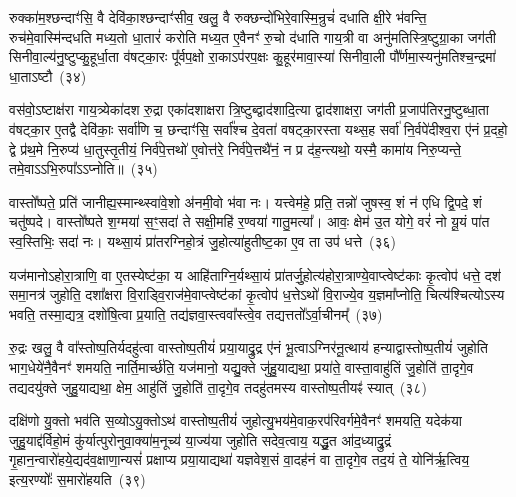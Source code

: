 रुक्का॑म॒श्छन्दाꣳ॑सि॒ वै देवि॑का॒श्छन्दाꣳ॑सीव॒ खलु॒ वै रुक्छन्दो॑भिरे॒वास्मि॒न्रुचं॑ दधाति क्षी॒रे भ॑वन्ति॒ रुच॑मे॒वास्मि॑न्दधति मध्य॒तो धा॒तारं॑ करोति मध्य॒त ए॒वैनꣳ॑ रु॒चो द॑धाति गाय॒त्री वा अनु॑मतिस्त्रि॒ष्टुग्रा॒का जग॑ती सिनीवा॒ल्य॑नु॒ष्टुप्कु॒हूर्धा॒ता व॑षट्का॒रः पू᳚र्वप॒क्षो रा॒काऽप॑रप॒क्षः कु॒हूर॑मावा॒स्या॑ सिनीवा॒ली पौ᳚र्णमा॒स्यनु॑\-मतिश्च॒न्द्रमा॑ धा॒ता\-ऽष्टौ~(३४)

वस॑वो॒\-ऽष्टाक्ष॑रा गाय॒त्र्येका॑\-दश रु॒द्रा एका॑\-दशाक्षरा त्रि॒ष्टुब्द्वाद॑शादि॒त्या द्वाद॑शाक्षरा॒ जग॑ती प्र॒जा\-प॑तिरनु॒ष्टुब्धा॒ता व॑षट्का॒र ए॒तद्वै देवि॑काः॒ सर्वा॑णि च॒ छन्दाꣳ॑सि॒ सर्वा᳚श्च दे॒वता॑ वषट्का॒रस्ता यथ्स॒ह सर्वा॑ नि॒र्वपे॑दीश्व॒रा ए॑नं प्र॒दहो॒ द्वे प्र॑थ॒मे नि॒रुप्य॑ धा॒तुस्तृ॒तीयं॒ निर्व॑पे॒त्तथो॑ ए॒वोत्त॑रे॒ निर्व॑पे॒त्तथै॑नं॒ न प्र द॑ह॒न्त्यथो॒ यस्मै॒ कामा॑य निरु॒प्यन्ते॒ तमे॒वाऽऽभि॒रुपा᳚ऽऽप्नोति॥~(३५)

{\anuvakamend[{प॒शुका॑म॒श्छन्दाꣳ॑सि॒ वै देवि॑का॒श्छन्दाꣳ॑सि॒ ग्राम॑ङ्कल्पयत्ये॒ता ए॒व निरु॑त्त॒मन्धा॒तारं॑ करोति मे॒धा न॑मत्ये॒ता ए॒व निर्व॑पेद॒ष्टौ द॑हन्ति॒ नव॑ च~(९) देविकाः प्रजाकामो मिथुनी पशुकाम}]}

वास्तो᳚ष्पते॒ प्रति॑ जानीह्य॒स्मान्थ्\-स्वा॑वे॒शो अ॑नमी॒वो भ॑वा नः। यत्त्वेम॑हे॒ प्रति॒ तन्नो॑ जुषस्व॒ शं न॑ एधि द्वि॒पदे॒ शं चतु॑ष्पदे। वास्तो᳚ष्पते श॒ग्मया॑ स॒ꣳ॒सदा॑ ते सक्षी॒महि॑ र॒ण्वया॑ गातु॒मत्या᳚। आवः॒ क्षेम॑ उ॒त योगे॒ वरं॑ नो यू॒यं पा॑त स्व॒स्तिभिः॒ सदा॑ नः। यथ्सा॒यं प्रा॑तरग्निहो॒त्रं जु॒होत्या॑हुतीष्ट॒का ए॒व ता उप॑ धत्ते~(३६)

यज॑मानो\-ऽहोरा॒त्राणि॒ वा ए॒तस्येष्ट॑का॒ य आहि॑ताग्नि॒र्यथ्सा॒यं प्रा॑तर्जु॒होत्य॑होरा॒त्राण्ये॒वाप्त्वेष्ट॑काः कृ॒त्वोप॑ धत्ते॒ दश॑ समा॒नत्र॑ जुहोति॒ दशा᳚क्षरा वि॒राड्वि॒राज॑मे॒वाप्त्वेष्ट॑कां कृ॒त्वोप॑ ध॒त्ते\-ऽथो॑ वि॒राज्ये॒व य॒ज्ञमा᳚प्नोति॒ चित्य॑श्चित्यो\-ऽस्य भवति॒ तस्मा॒द्यत्र॒ दशो॑षि॒त्वा प्र॒याति॒ तद्य॑ज्ञवा॒स्त्ववा᳚स्त्वे॒व तद्यत्ततो᳚\-ऽर्वा॒चीनम्᳚~(३७)

रु॒द्रः खलु॒ वै वा᳚स्तोष्प॒तिर्यदहु॑त्वा वास्तोष्प॒तीयं॑ प्रया॒याद्रु॒द्र ए॑नं भू॒त्वाऽग्निर॑नू॒त्थाय॑ हन्याद्वास्तोष्प॒तीयं॑ जुहोति भाग॒धेये॑नै॒वैनꣳ॑ शमयति॒ नार्ति॒मार्च्छ॑ति॒ यज॑मानो॒ यद्यु॒क्ते जु॑हु॒याद्यथा॒ प्रया॑ते॒ वास्ता॒वाहु॑तिं जु॒होति॑ ता॒दृगे॒व तद्यदयु॑क्ते जुहु॒याद्यथा॒ क्षेम॒ आहु॑तिं जु॒होति॑ ता॒दृगे॒व तदहु॑तमस्य वास्तोष्प॒तीयꣴ॑ स्यात्~(३८)

दक्षि॑णो यु॒क्तो भव॑ति स॒व्यो\-ऽयु॒क्तो\-ऽथ॑ वास्तोष्प॒तीयं॑ जुहोत्यु॒भय॑मे॒वाक॒रप॑रिवर्गमे॒वैनꣳ॑ शमयति॒ यदेक॑या जुहु॒याद्द॑र्विहो॒मं कु॑र्यात्पुरोनुवा॒क्या॑म॒नूच्य॑ या॒ज्य॑या जुहोति सदेव॒त्वाय॒ यद्धु॒त आ॑द॒ध्याद्रु॒द्रं गृ॒हान॒न्वारो॑हये॒द्यद॑व॒\-क्षाणा॒न्यसं॑ प्रक्षाप्य प्रया॒याद्यथा॑ यज्ञवेश॒सं वा॒दह॑नं वा ता॒दृगे॒व तद॒यं ते॒ योनि॑र्\mbox{}ऋ॒त्विय॒ इत्य॒रण्योः᳚ स॒मारो॑हयति~(३९)

